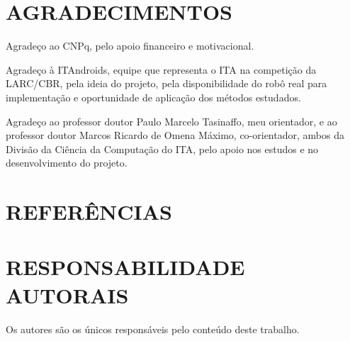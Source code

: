 \documentclass[10pt,fleqn,a4paper]{article}
\begin{document}
    \section{AGRADECIMENTOS}
    
	Agradeço ao CNPq, pelo apoio financeiro e motivacional.
	
	Agradeço à ITAndroids, equipe que representa o ITA na competição da LARC/CBR, pela ideia do projeto, pela disponibilidade do robô real para implementação e oportunidade de aplicação dos métodos estudados.

	Agradeço ao professor doutor Paulo Marcelo Tasinaffo, meu orientador, e ao professor doutor Marcos Ricardo de Omena Máximo, co-orientador, ambos da Divisão da Ciência da Computação do ITA, pelo apoio nos estudos e no desenvolvimento do projeto.

    \section{REFERÊNCIAS}
        
        

    \section{RESPONSABILIDADE AUTORAIS}
    
        Os autores são os únicos responsáveis pelo conteúdo deste trabalho.
\end{document}
